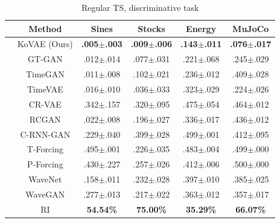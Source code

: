 \documentclass{article} %
\begin{document}
\begin{table}[ht]
    \centering
    \caption{Regular TS, discriminative task}
    \label{tab:regular_discriminative_app}
    \begin{tabular}{cccccc}
        \toprule
         & Method    & Sines & Stocks & Energy & MuJoCo  \\ 
        \midrule
        & KoVAE (Ours) & \cellcolor{blue!10}\textbf{.005$\pm$.003} & \cellcolor{blue!10}\textbf{.009$\pm$.006} & \cellcolor{blue!10}\textbf{.143$\pm$.011} & \cellcolor{blue!10}\textbf{.076$\pm$.017} \\
        \midrule
        & GT-GAN    & .012$\pm$.014  & .077$\pm$.031   & .221$\pm$.068 & .245$\pm$.029 \\
        & TimeGAN   & .011$\pm$.008  & .102$\pm$.021   & .236$\pm$.012 & .409$\pm$.028 \\
        & TimeVAE   & .016$\pm$.010  & .036$\pm$.033   & .323$\pm$.029 & .224$\pm$.026 \\ 
        & CR-VAE    & .342$\pm$.157  & .320$\pm$.095   & .475$\pm$.054 & .464$\pm$.012 \\
        & RCGAN     & .022$\pm$.008  & .196$\pm$.027   & .336$\pm$.017 & .436$\pm$.012 \\ 
        & C-RNN-GAN & .229$\pm$.040  & .399$\pm$.028   & .499$\pm$.001 & .412$\pm$.095 \\  
        & T-Forcing & .495$\pm$.001  & .226$\pm$.035   & .483$\pm$.004 & .499$\pm$.000 \\ 
        & P-Forcing & .430$\pm$.227  & .257$\pm$.026   & .412$\pm$.006 & .500$\pm$.000 \\
        & WaveNet   & .158$\pm$.011  & .232$\pm$.028   & .397$\pm$.010 & .385$\pm$.025 \\ 
        & WaveGAN   & .277$\pm$.013  & .217$\pm$.022   & .363$\pm$.012 & .357$\pm$.017 \\
        \midrule
        & RI & \textbf{54.54\%} & \textbf{75.00\%} & \textbf{35.29\%} & \textbf{66.07\%} \\
        \bottomrule
    \end{tabular}
\end{table}
\end{document}
